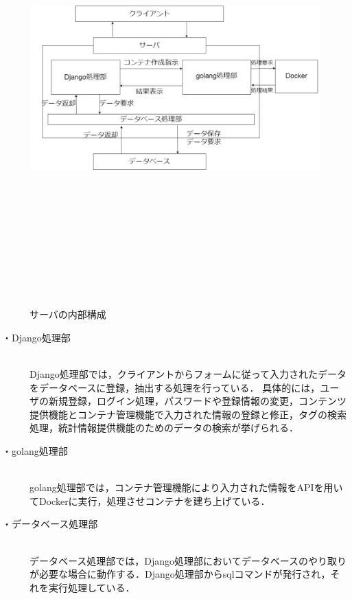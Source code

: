 \begin{figure}[htbp]
    \begin{center}
        \includegraphics[width=17cm,height=16cm,keepaspectratio]{server_arch-crop.pdf}\\
    \end{center}
    \caption{サーバの内部構成}
    \label{server_naibu}
\end{figure}

\begin{description}
    \item[・Django処理部]\mbox{}\\
        Django処理部では，クライアントからフォームに従って入力されたデータをデータベースに登録，抽出する処理を行っている．
        具体的には，ユーザの新規登録，ログイン処理，パスワードや登録情報の変更，コンテンツ提供機能とコンテナ管理機能で入力された情報の登録と修正，タグの検索処理，統計情報提供機能のためのデータの検索が挙げられる．
    \item[・golang処理部]\mbox{}\\
        golang処理部では，コンテナ管理機能により入力された情報をAPIを用いてDockerに実行，処理させコンテナを建ち上げている．
    \item[・データベース処理部]\mbox{}\\
        データベース処理部では，Django処理部においてデータベースのやり取りが必要な場合に動作する．Django処理部からsqlコマンドが発行され，それを実行処理している．
\end{description}

